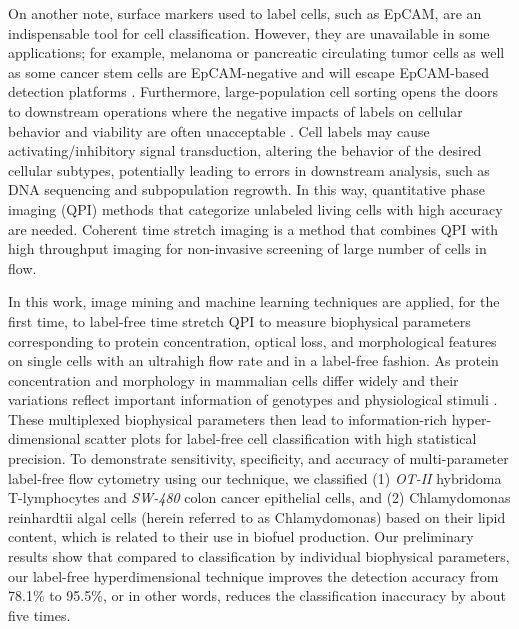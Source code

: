 \documentclass[aps,pra,reprint,superscriptaddress]{revtex4-1}
\begin{document}
On another note, surface markers used to label cells, such as EpCAM, are an indispensable tool for cell classification. However, they are unavailable in some applications; for example, melanoma or pancreatic circulating tumor cells as well as some cancer stem cells are EpCAM-negative and will escape EpCAM-based detection platforms \cite{kling2012beyond}. Furthermore, large-population cell sorting opens the doors to downstream operations where the negative impacts of labels on cellular behavior and viability are often unacceptable \cite{boddington2011labeling}. Cell labels may cause activating/inhibitory signal transduction, altering the behavior of the desired cellular subtypes, potentially leading to errors in downstream analysis, such as DNA sequencing and subpopulation regrowth. In this way, quantitative phase imaging (QPI) methods \cite{ikeda2005hilbert,popescu2011quantitative,pham2013real} that categorize unlabeled living cells with high accuracy are needed. Coherent time stretch imaging is a method that combines QPI with high throughput imaging for non-invasive screening of large number of cells in flow.

In this work, image mining and machine learning techniques are applied, for the first time, to label-free time stretch QPI to measure biophysical parameters corresponding to protein concentration, optical loss, and morphological features on single cells with an ultrahigh flow rate and in a label-free fashion. As protein concentration and morphology in mammalian cells differ widely \cite{feinerman2008variability, sigal2006variability, friebel1999optical, vona2000isolation} and their variations reflect important information of genotypes and physiological stimuli \cite{spencer2009non}. These multiplexed biophysical parameters then lead to information-rich hyper-dimensional scatter plots for label-free cell classification with high statistical precision. To demonstrate sensitivity, specificity, and accuracy of multi-parameter label-free flow cytometry using our technique, we classified (1) \textit{OT-II} hybridoma T-lymphocytes and \textit{SW-480} colon cancer epithelial cells, and (2) Chlamydomonas reinhardtii algal cells (herein referred to as Chlamydomonas) based on their lipid content, which is related to their use in biofuel production. Our preliminary results show that compared to classification by individual biophysical parameters, our label-free hyperdimensional technique improves the detection accuracy from 78.1\% to 95.5\%, or in other words, reduces the classification inaccuracy by about five times. 
\end{document}
